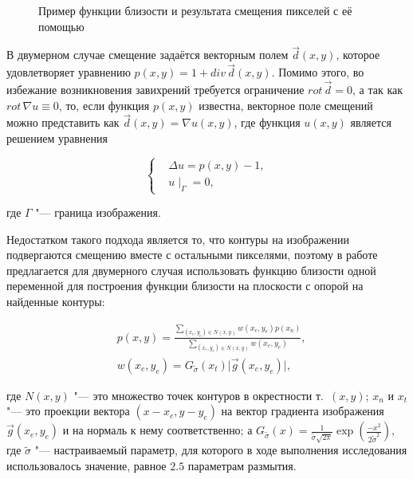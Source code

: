 \begin{figure}[ht]
	\caption{Пример функции близости и результата смещения пикселей с её помощью}
	\label{fig:warping-proximity}
\end{figure}

В двумерном случае смещение задаётся векторным полем $\vec{d}(x,y)$, которое удовлетворяет уравнению $p\left(x,y\right)=1+div\,\vec{d}(x,y)$. Помимо этого, во избежание возникновения завихрений требуется ограничение $rot\, \vec{d}=0$, а так как $rot\, \nabla u \equiv 0$, то, если функция $p(x, y)$ известна, векторное поле смещений можно представить как $\vec{d}\left(x,y\right)=\nabla u\left(x,y\right)$, где функция $u\left(x,y\right)$ является решением уравнения

\begin{equation*}
	\left\{
		\begin{aligned}
			&\Delta u = p\left(x,y\right) - 1, \\
			&u\mid_\Gamma=0,
		\end{aligned}
	\right.
\end{equation*}

\noindent где $\Gamma$ "--- граница изображения.

Недостатком такого подхода является то, что контуры на изображении подвергаются смещению вместе с остальными пикселями, поэтому в работе~\cite{gusev2016parallel} предлагается для двумерного случая использовать функцию близости одной переменной для построения функции близости на плоскости с опорой на найденные контуры:

\begin{align*}
	&p\left(x,y\right) = \frac{\sum_{\left(x_e,y_e\right) \in N\left(x,y\right)}{w\left(x_e,y_e\right)p\left(x_n\right)}} {\sum_{\left(x_e,y_e\right) \in N\left(x,y\right)}{w\left(x_e,y_e\right)}}, \\
	&w\left(x_e,y_e\right) = G_{\widetilde{\sigma}}\left(x_t\right)\lvert \vec{g}\left(x_e,y_e\right) \rvert,
\end{align*}

\noindent где $N\left(x,y\right)$ "--- это множество точек контуров в окрестности т.~$\left(x, y\right)$; $x_n$ и $x_t$ "--- это проекции вектора $\left(x-x_e, y-y_e\right)$ на вектор градиента изображения $\vec{g}\left(x_e,y_e\right)$ и на нормаль к нему соответственно; а $G_{\widetilde{\sigma}}\left(x\right) = \frac{1}{\widetilde{\sigma} \sqrt{2\pi}} \exp\left(\frac{-x^2}{2\widetilde{\sigma}^2}\right)$, где $\widetilde{\sigma}$ "--- настраиваемый параметр, для которого в ходе выполнения исследования использовалось значение, равное $2.5$ параметрам размытия.

